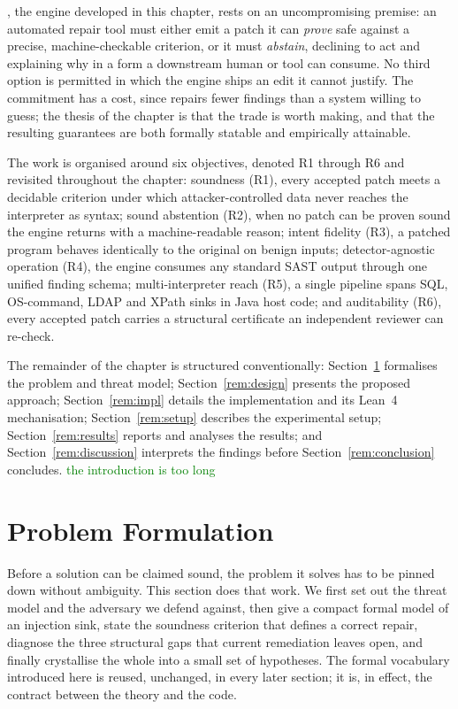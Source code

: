 \irsam{}, the engine developed in this chapter, rests on an uncompromising
premise: an automated repair tool must either emit a patch it can
\emph{prove} safe against a precise, machine-checkable criterion, or it must
\emph{abstain}, declining to act and explaining why in a form a downstream
human or tool can consume. No third option is permitted in which the engine
ships an edit it cannot justify. The commitment has a cost, since \irsam{}
repairs fewer findings than a system willing to guess; the thesis of the
chapter is that the trade is worth making, and that the resulting guarantees
are both formally statable and empirically attainable.

The work is organised around six objectives, denoted R1 through R6 and
revisited throughout the chapter: soundness (R1), every accepted patch meets
a decidable criterion under which attacker-controlled data never reaches the
interpreter as syntax; sound abstention (R2), when no patch can be proven
sound the engine returns \bottom{} with a machine-readable reason; intent
fidelity (R3), a patched program behaves identically to the original on
benign inputs; detector-agnostic operation (R4), the engine consumes any
standard SAST output through one unified finding schema; multi-interpreter
reach (R5), a single pipeline spans SQL, OS-command, LDAP and XPath sinks in
Java host code; and auditability (R6), every accepted patch carries a
structural certificate an independent reviewer can re-check.
\label{sec:objectives}

The remainder of the chapter is structured conventionally:
Section~\ref{rem:problem} formalises the problem and threat model;
Section~\ref{rem:design} presents the proposed approach;
Section~\ref{rem:impl} details the implementation and its Lean~4
mechanisation; Section~\ref{rem:setup} describes the experimental setup;
Section~\ref{rem:results} reports and analyses the results; and
Section~\ref{rem:discussion} interprets the findings before
Section~\ref{rem:conclusion} concludes. \textcolor{green}{the introduction is too long}


\section{Problem Formulation}
\label{rem:problem}

Before a solution can be claimed sound, the problem it solves has to be
pinned down without ambiguity. This section does that work. We first set out
the threat model and the adversary we defend against, then give a compact
formal model of an injection sink, state the soundness criterion that
defines a correct repair, diagnose the three structural gaps that current
remediation leaves open, and finally crystallise the whole into a small set
of hypotheses. The formal vocabulary introduced here is reused, unchanged,
in every later section; it is, in effect, the contract between the theory
and the code.

